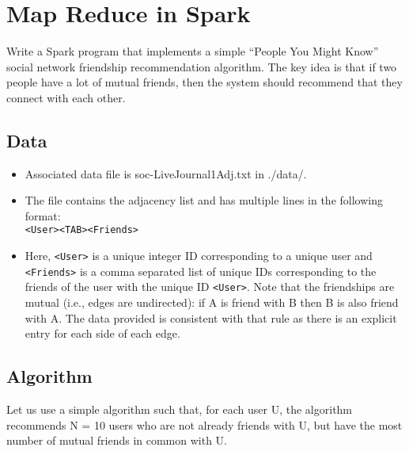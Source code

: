 \documentclass[paper=a4, fontsize=11pt]{scrartcl} %
\author{
    \textbf{YOUR NAME} \\ 
    \textbf{YOUR GIT USERNAME} \\ 
    \textbf{YOUR E-MAIL}
}%
\begin{document}
\maketitle %

\section{Map Reduce in Spark}

Write a Spark program that implements a simple “People You Might Know” social network friendship recommendation algorithm. The key idea is that if two people have a lot of mutual friends, then the system should recommend that they connect with each other. 

\subsection{Data}



\begin{itemize}
    \item Associated data file is soc-LiveJournal1Adj.txt in ./data/. 
    \item The file contains the adjacency list and has multiple lines in the following format: \\ \verb"<User><TAB><Friends>"
    \item Here, \verb"<User>" is a unique integer ID corresponding to a unique user and \verb"<Friends>" is a comma separated list of unique IDs corresponding to the friends of the user with the unique ID \verb"<User>". Note that the friendships are mutual (i.e., edges are undirected): if A is friend with B then B is also friend with A. The data provided is consistent with that rule as there is an explicit entry for each side of each edge.
\end{itemize}

\subsection{Algorithm}
Let us use a simple algorithm such that, for each user U, the algorithm recommends N = 10 users who are not already friends with U, but have the most number of mutual friends in common with U. 
\end{document}
